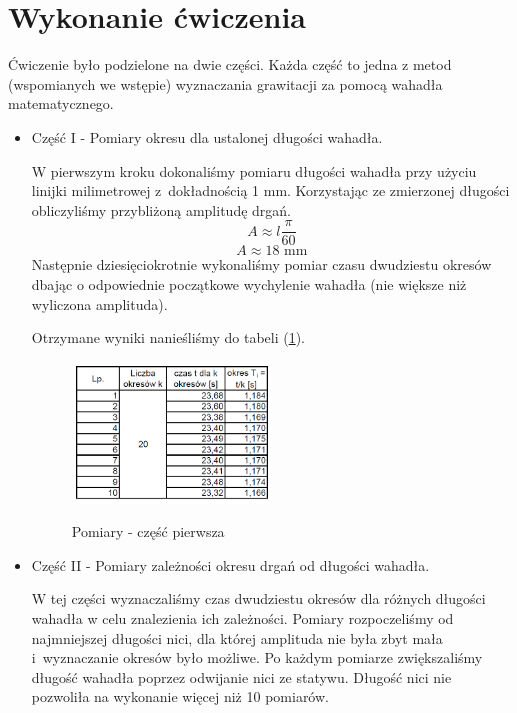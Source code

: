 \documentclass [a4paper,11pt]{article}
\begin{document}
	\section{Wykonanie ćwiczenia}
	Ćwiczenie było podzielone na dwie części. Każda część to jedna z metod (wspomianych we wstępie) wyznaczania grawitacji za pomocą wahadła matematycznego.
	\begin{itemize}
		\item Część I - Pomiary okresu dla ustalonej długości wahadła.
		
		W pierwszym kroku dokonaliśmy pomiaru długości wahadła przy użyciu linijki milimetrowej z~dokładnością 1 mm. Korzystając ze zmierzonej długości obliczyliśmy przybliżoną amplitudę drgań.
		\begin{equation}
			\label{eq:amplituda} 
			A \approx l \frac{\pi}{60} 
		\end{equation}
		$$ A \approx  18 \text{ mm}$$
		Następnie dziesięciokrotnie wykonaliśmy pomiar czasu dwudziestu okresów dbając o odpowiednie początkowe wychylenie wahadła (nie większe niż wyliczona amplituda).
		
		Otrzymane wyniki nanieśliśmy do tabeli (\ref{fig:czescpierwsza}).
		
		\begin{figure}[!h]
			\centering
			\caption{Pomiary - część pierwsza}
			\includegraphics[width=0.5\textwidth]{wykres1}
			\label{fig:czescpierwsza}
		\end{figure}
		
		\item Część II - Pomiary zależności okresu drgań od długości wahadła.
		
		W tej części wyznaczaliśmy czas dwudziestu okresów dla różnych długości wahadła w celu znalezienia ich zależności. Pomiary rozpoczeliśmy od najmniejszej długości nici, dla której amplituda nie była zbyt mała i~wyznaczanie okresów było możliwe. Po każdym pomiarze zwiększaliśmy długość wahadła poprzez odwijanie nici ze statywu. Długość nici nie pozwoliła na wykonanie więcej niż 10 pomiarów.
		

\end{itemize}
\end{document}
